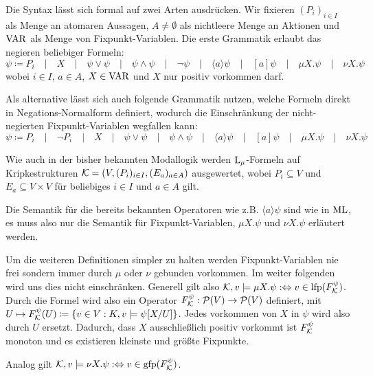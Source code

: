 Die Syntax lässt sich formal auf zwei Arten ausdrücken. Wir fixieren $(P_i)_{i\in I}$ als Menge an atomaren Aussagen, $A\neq\emptyset$ als nichtleere Menge an Aktionen und $\operatorname{VAR}$ als Menge von Fixpunkt-Variablen.
 Die erste Grammatik erlaubt das negieren beliebiger Formeln:
 \[\psi \coloneqq P_i \quad\vert\quad X \quad\vert\quad \psi\lor \psi \quad\vert\quad \psi \land \psi \quad\vert\quad \neg\psi \quad\vert\quad \langle a \rangle \psi \quad\vert\quad [a]\psi \quad\vert\quad \mu X.\psi \quad\vert\quad \nu X.\psi\]
 wobei $i\in I$, $a\in A$, $X\in \operatorname{VAR}$ und $X$ nur positiv vorkommen darf.
 
Als alternative lässt sich auch folgende Grammatik nutzen, welche Formeln direkt in Negations-Normalform definiert, wodurch die Einschränkung der nicht-negierten Fixpunkt-Variablen wegfallen kann:
\[\psi \coloneqq P_i \quad\vert\quad \neg P_i \quad\vert\quad X \quad\vert\quad \psi\lor \psi \quad\vert\quad \psi \land \psi \quad\vert\quad \langle a \rangle \psi \quad\vert\quad [a]\psi \quad\vert\quad \mu X.\psi \quad\vert\quad \nu X.\psi\]

Wie auch in der bisher bekannten Modallogik werden $\operatorname{L}_\mu$-Formeln auf Kripkestrukturen $\mathcal{K}=(V,(P_i)_{i\in I}, (E_a)_{a\in A})$ ausgewertet, wobei $P_i\subseteq V$ und $E_a\subseteq V\times V$ für beliebiges $i\in I$ und $a\in A$ gilt.

Die Semantik für die bereits bekannten Operatoren wie z.B. $\langle a \rangle \psi$ sind wie in $\operatorname{ML}$, es muss also nur die Semantik für Fixpunkt-Variablen, $\mu X.\psi$ und $\nu X.\psi$ erläutert werden.

Um die weiteren Definitionen simpler zu halten werden Fixpunkt-Variablen nie frei sondern immer durch $\mu$ oder $\nu$ gebunden vorkommen. 
Im weiter folgenden wird uns dies nicht einschränken. Generell gilt also $\mathcal{K},v\models \mu X.\psi :\Leftrightarrow v \in \operatorname{lfp}(F^\psi_{\mathcal{K}})$. 
Durch die Formel wird also ein Operator $F^\psi_{\mathcal{K}}: \mathcal{P}(V)\to \mathcal{P}(V)$ definiert, mit $U\mapsto F^\psi_{\mathcal{K}}(U)\coloneqq \{v\in V : K,v \models \psi [X / U]\}$. 
Jedes vorkommen von $X$ in $\psi$ wird also durch $U$ ersetzt. Dadurch, dass $X$ ausschließlich positiv vorkommt ist $F^\psi_{\mathcal{K}}$ monoton und es existieren kleinste und größte Fixpunkte.

Analog gilt $\mathcal{K}, v \models \nu X.\psi :\Leftrightarrow v \in \operatorname{gfp}(F^\psi_{\mathcal{K}})$.

